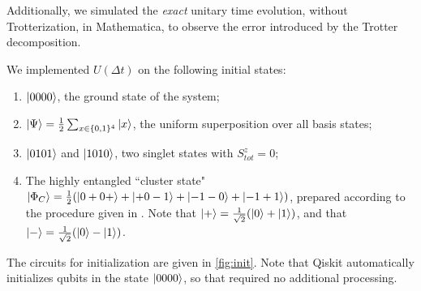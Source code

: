 \documentclass[10pt]{amsart}
\theoremstyle{definition}
\begin{document}
Additionally, we simulated the \textit{exact} unitary time evolution, without
Trotterization, in Mathematica, to observe the error introduced by the Trotter
decomposition.

We implemented $U(\Delta t)$ on the following initial states:
\begin{enumerate}[label=(\roman*)]
  \item $\ket{0000}$, the ground state of the system;
  \item $\ket{\Psi} = \frac12 \sum_{x \in \{0,1\}^4} \ket{x}$, the uniform
        superposition over all basis states;
  \item $\ket{0101}$ and $\ket{1010}$, two singlet states with $S_{tot}^z = 0$;
  \item The highly entangled ``cluster state" $\ket{\Phi_C} 
        = \frac12\qty(\ket{0+0+} + \ket{+0-1} + \ket{-1-0} + \ket{-1+1})$,
        prepared according to the procedure given in 
        \cite{Jorrand2005}. Note that 
        $\ket{+} = \frac{1}{\sqrt{2}} \qty(\ket{0} + \ket{1})$, and that
        $\ket{-} = \frac{1}{\sqrt{2}} \qty(\ket{0} - \ket{1})$.
\end{enumerate}
The circuits for initialization are given in \cref{fig:init}. Note that Qiskit
automatically initializes qubits in the state $\ket{0000}$, so that required no
additional processing.
\end{document}
